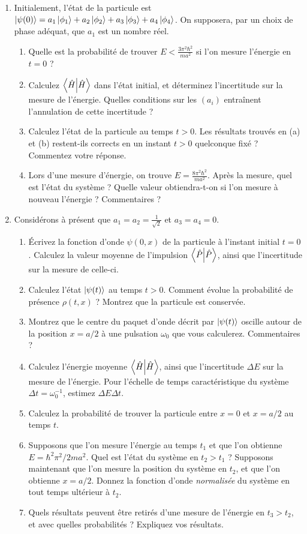 \begin{enumerate}
\item Initialement, l'état de la particule est $\ket{\psi(0)} = a_1\ket{\phi_1}+a_2\ket{\phi_2}+a_3\ket{\phi_3}+a_4\ket{\phi_4}$. On supposera, par un choix de phase adéquat, que $a_1$ est un nombre réel.
\begin{enumerate}
\item Quelle est la probabilité de trouver $E < \frac{3\pi^2\hbar^2}{ma^2}$ si l'on mesure l'énergie en $t=0$ ?
\item Calculez $\braket{\hat H}$ dans l'état initial, et déterminez l'incertitude sur la mesure de l'énergie. Quelles conditions sur les $(a_i)$ entraînent l'annulation de cette incertitude ?
\item Calculez l'état de la particule au temps $t>0$. Les résultats trouvés en (a) et (b) restent-ils corrects en un instant $t>0$ quelconque fixé ? Commentez votre réponse.
\item Lors d'une mesure d'énergie, on trouve $E=\frac{8\pi^2\hbar^2}{ma^2}$. Après la mesure, quel est l'état du système ? Quelle valeur obtiendra-t-on si l'on mesure à nouveau l'énergie ? Commentaires ?
\end{enumerate}
\item Considérons à présent que $a_1=a_2=\frac{1}{\sqrt{2}}$ et $a_3=a_4=0$. 
\begin{enumerate}
\item Écrivez la fonction d'onde $\psi(0,x)$ de la particule à l'instant initial $t=0$. Calculez la valeur moyenne de l'impulsion $\braket{\hat P}$, ainsi que l'incertitude sur la mesure de celle-ci.
\item Calculez l'état $\ket{\psi(t)}$ au temps $t>0$. Comment évolue la probabilité de présence $\rho(t,x)$ ? Montrez que la particule est conservée.
\item Montrez que le centre du paquet d'onde décrit par $\ket{\psi(t)}$ oscille autour de la position $x=a/2$ à une pulsation $\omega_0$ que vous calculerez. Commentaires ?
\item Calculez l'énergie moyenne $\braket{\hat H}$, ainsi que l'incertitude $\Delta E$ sur la mesure de l'énergie. Pour l'échelle de temps caractéristique du système $\Delta t = \omega_0^{-1}$, estimez $\Delta E\Delta t$.
\item Calculez la probabilité de trouver la particule entre $x=0$ et $x=a/2$ au temps $t$.
\item Supposons que l'on mesure l'énergie au temps $t_1$ et que l'on obtienne $E = \hbar^2\pi^2/2ma^2$. Quel est l'état du système en $t_2>t_1$ ? Supposons maintenant que l'on mesure la position du système en $t_2$, et que l'on obtienne $x=a/2$. Donnez la fonction d'onde \textit{normalisée} du système en tout temps ultérieur à $t_2$.
\item Quels résultats peuvent être retirés d'une mesure de l'énergie en $t_3>t_2$, et avec quelles probabilités ? Expliquez vos résultats.
\end{enumerate}
\end{enumerate}

